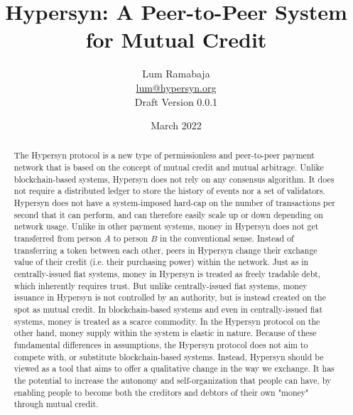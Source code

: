 \documentclass{article}
\title{Hypersyn: A Peer-to-Peer System for Mutual Credit}
\author{Lum Ramabaja \\ \href{mailto:lum@hypersyn.org}{lum@hypersyn.org} \\ Draft Version 0.0.1 }%
\date{March 2022}
\begin{document}
\maketitle

\begin{abstract}
    The Hypersyn protocol is a new type of permissionless and peer-to-peer payment network that is based on the concept of mutual credit and mutual arbitrage. Unlike blockchain-based systems, Hypersyn does not rely on any consensus algorithm. It does not require a distributed ledger to store the history of events nor a set of validators. Hypersyn does not have a system-imposed hard-cap on the number of transactions per second that it can perform, and can therefore easily scale up or down depending on network usage. Unlike in other payment systems, money in Hypersyn does not get transferred from person $A$ to person $B$ in the conventional sense. Instead of transferring a token between each other, peers in Hypersyn change their exchange value of their credit (i.e. their purchasing power) within the network. Just as in centrally-issued fiat systems, money in Hypersyn is treated as freely tradable debt, which inherently requires trust. But unlike centrally-issued fiat systems, money issuance in Hypersyn is not controlled by an authority, but is instead created on the spot as mutual credit. In blockchain-based systems and even in centrally-issued fiat systems, money is treated as a scarce commodity. In the Hypersyn protocol on the other hand, money supply within the system is elastic in nature. Because of these fundamental differences in assumptions, the Hypersyn protocol does not aim to compete with, or substitute blockchain-based systems. Instead, Hypersyn should be viewed as a tool that aims to offer a qualitative change in the way we exchange. It has the potential to increase the autonomy and self-organization that people can have, by enabling people to become both the creditors and debtors of their own "money" through mutual credit.
\end{abstract}


\end{document}
